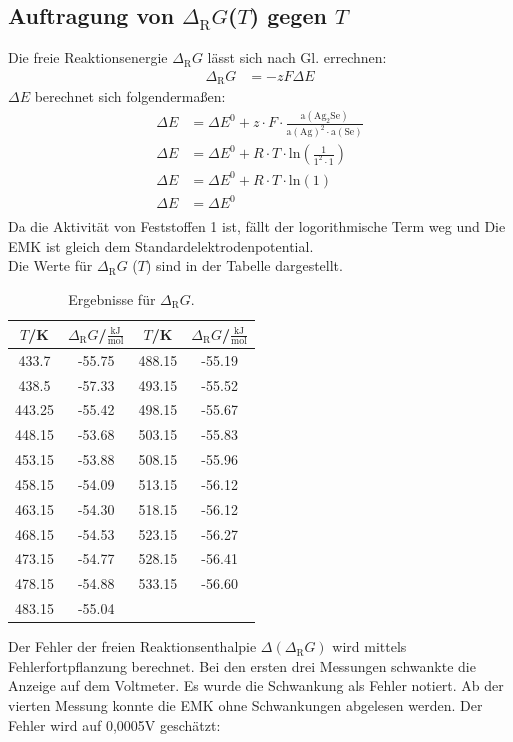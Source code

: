 \documentclass[12pt,a4paper,titlepage,headinclude,bibtotoc]{scrartcl}
\begin{document}
\subsection{Auftragung von $\Delta_\text{R} G$($T$) gegen $T$}
Die freie Reaktionsenergie $\Delta_\text{R} G$ lässt sich nach Gl. errechnen:
\begin{align}
\Delta_\text{R} G &= - z F \Delta E 
\end{align}
$\Delta E$ berechnet sich folgendermaßen:
\begin{align}
\Delta E &= \Delta E^0 + z\cdot F \cdot \frac{\text{a}(\text{Ag}_2\text{Se})}{\text{a}(\text{Ag})^2\cdot\text{a}(\text{Se})}\\
\Delta E &= \Delta E^0 + R\cdot T\cdot \text{ln}(\frac{1}{1^2\cdot1})\\
\Delta E &= \Delta E^0 + R\cdot T \cdot \text{ln}(1)\\
\Delta E &= \Delta E^0 \\
\end{align}
Da die Aktivität von Feststoffen 1 ist, fällt der logorithmische Term weg und Die EMK ist gleich dem Standardelektrodenpotential.\\
Die Werte für $\Delta_\text{R} G$ ($T$) sind in der Tabelle dargestellt.
\begin{table}[h!]
\centering
\caption{Ergebnisse für $\Delta_\text{R} G$.}
\begin{tabular}{c|c||c|c}
$T$/\;K & $\Delta_\text{R} G$/\;$\frac{\text{kJ}}{\text{mol}}$ &$T$/\;K & $\Delta_\text{R} G$/\;$\frac{\text{kJ}}{\text{mol}}$\\ 
\hline
433.7 & -55.75 &488.15 & -55.19 \\ 
438.5 & -57.33 & 493.15& -55.52 \\
443.25 & -55.42 &  498.15& -55.67\\
448.15 & -53.68 & 503.15&  -55.83\\
453.15 & -53.88 & 508.15 & -55.96\\
458.15 & -54.09 & 513.15 & -56.12\\
463.15 & -54.30 & 518.15 & -56.12\\
468.15 & -54.53 & 523.15& -56.27\\
473.15 & -54.77 & 528.15 & -56.41\\
478.15 & -54.88 & 533.15& -56.60\\
483.15 & -55.04 &&\\
\end{tabular} 
\end{table}
\FloatBarrier
Der Fehler der freien Reaktionsenthalpie $\Delta(\Delta_\text{R} G)$  wird mittels Fehlerfortpflanzung berechnet. Bei den ersten drei Messungen schwankte die Anzeige auf dem Voltmeter. Es wurde die Schwankung als Fehler notiert. Ab der vierten Messung konnte die EMK ohne Schwankungen abgelesen werden. Der Fehler wird auf 0,0005\;V geschätzt:
\end{document}
